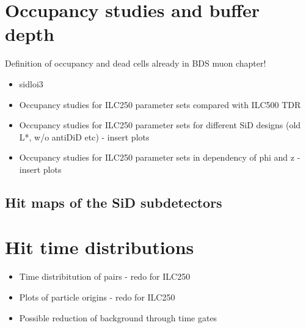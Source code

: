 \section{Occupancy studies and buffer depth}
\label{PairBkg:occupancy}
Definition of occupancy and dead cells already in BDS muon chapter!
\begin{itemize}
 \item sidloi3
 \item Occupancy studies for ILC250 parameter sets compared with ILC500 TDR
 \item Occupancy studies for ILC250 parameter sets for different SiD designs (old L*, w/o antiDiD etc) - insert plots
 \item Occupancy studies for ILC250 parameter sets in dependency of phi and z - insert plots
\end{itemize}

\subsection{Hit maps of the SiD subdetectors}
\label{PairBkg:hitmaps}


\section{Hit time distributions}
\label{PairBkg:hittime}

\begin{itemize}
 \item Time distribitution of pairs - redo for ILC250
 \item Plots of particle origins - redo for ILC250
 \item Possible reduction of background through time gates
\end{itemize}

